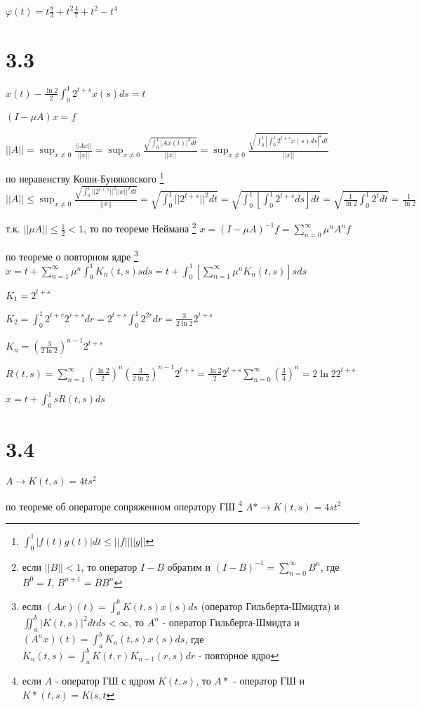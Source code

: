 \documentclass[russian]{article}
\begin{document}
$\varphi(t) = t \frac{8}{3} + t^2 \frac{4}{7} + t^2 - t^4$

\section*{3.3}

$x(t) - \frac{\ln 2}{2}\int_0^1 2^{t+s} x(s) ds = t$

$(I-\mu A)x = f$

$||A||=\sup_{x \ne 0} \frac{||Ax||}{||x||} = \sup_{x \ne 0} \frac{\sqrt{\int_0^1 |Ax(t)|^2 dt}}{||x||}=\sup_{x \ne 0} \frac{\sqrt{\int_0^1 |\int_0^1 2^{t+s}x(s)ds|^2 dt}}{||x||}$ 

по неравенству Коши-Буняковского \footnote{
	$\int_0^1|f(t) g(t)| dt \le ||f|| ||g|| $
}
$||A|| \le \sup_{x \ne 0} \frac{\sqrt{\int_0^1 ||2^{t+s}||^2 ||x||^2 dt}}{||x||} = \sqrt{\int_0^1 ||2^{t+s}||^2 dt} = \sqrt{\int_0^1 [\int_0^1 2^{t+s} ds]dt} =\sqrt{\frac{1}{\ln 2} \int_0^1 2^t dt} = \frac{1}{\ln 2}$

т.к. $||\mu A|| \le \frac{1}{2} < 1$, то по теореме Неймана \footnote{
	если $||B|| < 1$, то оператор $I-B$ обратим и $(I-B)^{-1} = \sum _{n=0}^\infty B^n$, где $B^0 = I$, $B^{n+1} = B B^n$
}
$x=(I-\mu A)^{-1}f=\sum_{n=0}^{\infty}\mu^n A^n f$

по теореме о повторном ядре \footnote{
	если $(Ax)(t)=\int_a^bK(t,s)x(s)ds$ (оператор Гильберта-Шмидта)
	и $\iint_{a}^{b}|K(t,s)|^2 dt ds < \infty$, то $A^n$ - оператор Гильберта-Шмидта 
	и $(A^n x)(t) = \int_a^b K_n(t,s)x(s) ds$, где $K_n(t,s) = \int_a^b K(t,r) K_{n-1}(r,s)dr$ - повторное ядро
} $x=t + \sum_{n=1}^{\infty}\mu^n \int_0^1 K_n(t,s)s ds=t+\int_0^1[\sum_{n=1}^\infty \mu ^n K_n(t,s)]s ds$

$K_1 = 2^{t+s}$

$K_2 = \int_0^1 2^{t+r} 2^{r+s} dr = 2^{t+s} \int_0^1 2^{2r} dr = \frac{3}{2 \ln 2} 2^{t+s}$

$K_n = (\frac{3}{2 \ln 2})^{n-1} 2^{t+s} $

$R(t,s) = \sum_{n=1}^\infty (\frac{\ln 2}{2})^n (\frac{3}{2 \ln 2})^{n-1} 2^{t+s} = \frac{\ln 2}{2} 2^{t+s} \sum_{n=0}^\infty (\frac{3}{4})^n = 2 \ln 2 2^{t+s}$

$x=t+\int_0^1 s R(t,s) ds$

\section*{3.4}

$A \to K(t,s)=4 t s^2$

по теореме об операторе сопряженном оператору ГШ \footnote{
	если $A$ - оператор ГШ с ядром $K(t,s)$, то $A*$ - оператор ГШ и $K*(t,s)=\overline{K(s,t}$
}
$A* \to K(t,s)=4 s t^2$
\end{document}

